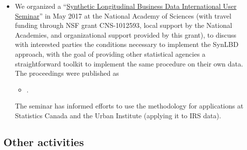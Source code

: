 \documentclass[12pt]{article}
\begin{document}
\begin{itemize}
\item We organized a ``\href{https://www.ncrn.cornell.edu/event/synthetic-longitudinal-business-data-international-user-seminar/?instance_id=104227}{Synthetic Longitudinal Business Data International User Seminar}'' in May 2017 at the National Academy of Sciences (with travel funding through NSF grant CNS-1012593, local support by the National Academies, and organizational support provided by this grant), to discuss with interested parties the conditions necessary to implement the SynLBD approach, with the goal of providing other statistical agencies a straightforward toolkit to implement the same procedure on their own data. The proceedings were published as \begin{itemize}
	\item[] .
\end{itemize}
The seminar has informed efforts to use the methodology for applications at Statistics Canada and the Urban Institute (applying it to IRS data).
\end{itemize}


	



\subsection{Other activities}
\end{document}
